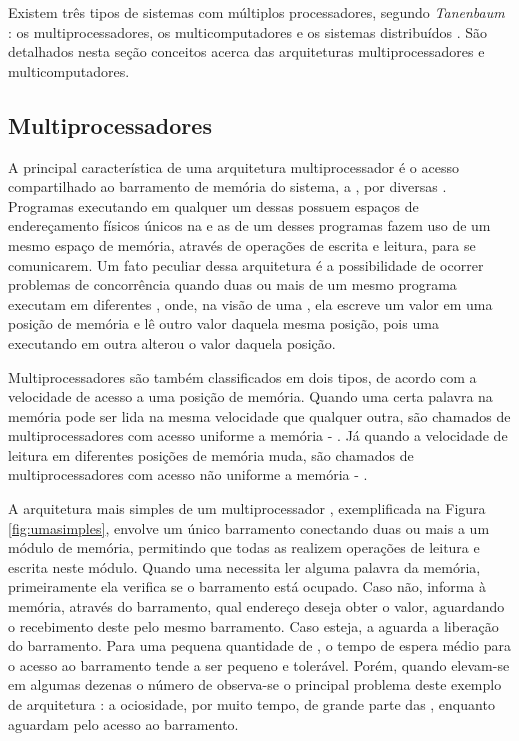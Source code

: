 Existem três tipos de sistemas com múltiplos processadores, segundo \textit{Tanenbaum} \etal : os multiprocessadores, os multicomputadores e os sistemas distribuídos \cite{TanenbaumMordenOS}. São detalhados nesta seção conceitos acerca das arquiteturas multiprocessadores e multicomputadores.

\subsection{Multiprocessadores}
\label{sec:multiprocessadores}

A principal característica de uma arquitetura multiprocessador é o acesso compartilhado ao barramento de memória do sistema, a \RAM, por diversas \CPUs. Programas executando em qualquer um dessas \CPUs possuem espaços de endereçamento físicos únicos na \RAM e as \threads de um desses programas fazem uso de um mesmo espaço de memória, através de operações de escrita e leitura, para se comunicarem. Um fato peculiar dessa arquitetura é a possibilidade de ocorrer problemas de concorrência quando duas ou mais \threads de um mesmo programa executam em diferentes \CPUs, onde, na visão de uma \CPU, ela escreve um valor em uma posição de memória e lê outro valor daquela mesma posição, pois uma \thread executando em outra \CPU alterou o valor daquela posição. 

Multiprocessadores são também classificados em dois tipos, de acordo com a velocidade de acesso a uma posição de memória. Quando uma certa palavra na memória pode ser lida na mesma velocidade que qualquer outra, são chamados de multiprocessadores com acesso uniforme a memória - \UMA. Já quando a velocidade de leitura em diferentes posições de memória muda, são chamados de multiprocessadores com acesso não uniforme a memória - \NUMA. 

A arquitetura mais simples de um multiprocessador \UMA, exemplificada na Figura \ref{fig:umasimples}, envolve um único barramento conectando duas ou mais \CPUs a um módulo de memória, permitindo que todas as \CPUs realizem operações de leitura e escrita neste módulo. Quando uma \CPU necessita ler alguma palavra da memória, primeiramente ela verifica se o barramento está ocupado. Caso não, informa à memória, através do barramento, qual endereço deseja obter o valor, aguardando o recebimento deste pelo mesmo barramento. Caso esteja, a \CPU aguarda a liberação do barramento. Para uma pequena quantidade de \CPUs, o tempo de espera médio para o acesso ao barramento tende a ser pequeno e tolerável. Porém, quando elevam-se em algumas dezenas o número de \CPUs observa-se o principal problema deste exemplo de arquitetura \UMA: a ociosidade, por muito tempo, de grande parte das \CPUs, enquanto aguardam pelo acesso ao barramento.

